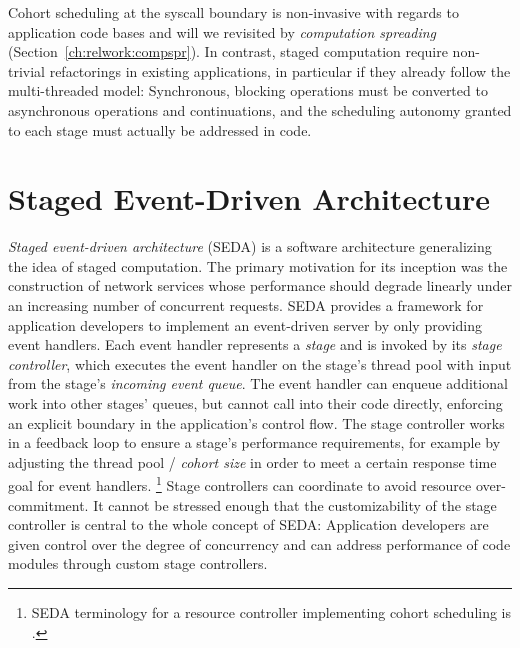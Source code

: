 \documentclass[12pt,a4paper]{book}
\begin{document}
Cohort scheduling at the syscall boundary is non-invasive with regards to application code bases and will we revisited by \emph{computation spreading} (Section~\ref{ch:relwork:compspr}).
In contrast, staged computation require non-trivial refactorings in existing applications, in particular if they already follow the multi-threaded model:
Synchronous, blocking operations must be converted to asynchronous operations and continuations, and the scheduling autonomy granted to each stage must actually be addressed in code.

\section{Staged Event-Driven Architecture}\label{ch:relwork:seda}
\emph{Staged event-driven architecture} (SEDA) is a software architecture generalizing the idea of staged computation.
The primary motivation for its inception was the construction of network services whose performance should degrade linearly under an increasing number of concurrent requests.
SEDA provides a framework for application developers to implement an event-driven server by only providing event handlers.
Each event handler represents a \emph{stage} and is invoked by its \emph{stage controller}, which executes the event handler on the stage's thread pool with input from the stage's \emph{incoming event queue}.
The event handler can enqueue additional work into other stages' queues, but cannot call into their code directly, enforcing an explicit boundary in the application's control flow.
The stage controller works in a feedback loop to ensure a stage's performance requirements, for example by adjusting the thread pool / \emph{cohort size} in order to meet a certain response time goal for event handlers.%
\footnote{SEDA terminology for a resource controller implementing cohort scheduling is .}
Stage controllers can coordinate to avoid resource over-commitment.
It cannot be stressed enough that the customizability of the stage controller is central to the whole concept of SEDA:
Application developers are given control over the degree of concurrency and can address performance of code modules through custom stage controllers.~\cite{seda}
\end{document}
